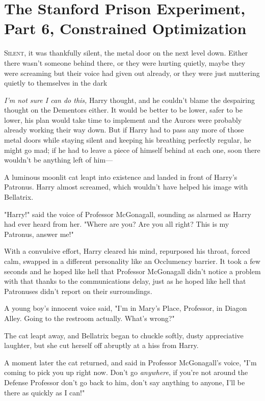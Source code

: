 \chapter{The Stanford Prison Experiment, Part 6, Constrained Optimization}

\lettrine{S}{ilent}, it was
thankfully silent, the metal door on the next level down. Either there wasn't
someone behind there, or they were hurting quietly, maybe they were screaming
but their voice had given out already, or they were just muttering quietly to
themselves in the dark{\el}

\emph{I'm not sure I can do this,} Harry thought, and he couldn't blame the
despairing thought on the Dementors either. It would be better to be lower,
safer to be lower, his plan would take time to implement and the Aurors were
probably already working their way down. But if Harry had to pass any more of
those metal doors while staying silent and keeping his breathing perfectly
regular, he might go mad; if he had to leave a piece of himself behind at each
one, soon there wouldn't be anything left of him—

A luminous moonlit cat leapt into existence and landed in front of Harry's
Patronus. Harry almost screamed, which wouldn't have helped his image with
Bellatrix.

"Harry!" said the voice of Professor McGonagall, sounding as alarmed as Harry
had ever heard from her. "Where are you? Are you all right? This is my
Patronus, answer me!"

With a convulsive effort, Harry cleared his mind, repurposed his throat, forced
calm, swapped in a different personality like an Occlumency barrier. It took a
few seconds and he hoped like hell that Professor McGonagall didn't notice a
problem with that thanks to the communications delay, just as he hoped like
hell that Patronuses didn't report on their surroundings.

A young boy's innocent voice said, "I'm in Mary's Place, Professor, in Diagon
Alley. Going to the restroom actually. What's wrong?"

The cat leapt away, and Bellatrix began to chuckle softly, dusty appreciative
laughter, but she cut herself off abruptly at a hiss from Harry.

A moment later the cat returned, and said in Professor McGonagall's voice, "I'm
coming to pick you up right now. Don't go \emph{anywhere}, if you're not around
the Defense Professor don't go back to him, don't say anything to anyone, I'll
be there as quickly as I can!"

